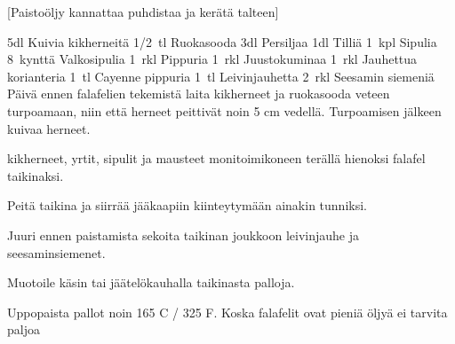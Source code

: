 [Paistoöljy kannattaa puhdistaa ja kerätä talteen]

\begin{step}
  5dl Kuivia kikherneitä
  1/2~tl Ruokasooda
  3dl Persiljaa
  1dl Tilliä
  1~kpl Sipulia
  8~kynttä Valkosipulia
  1~rkl Pippuria
  1~rkl Juustokuminaa
  1~rkl Jauhettua korianteria
  1~tl Cayenne pippuria
  1~tl Leivinjauhetta
  2~rkl Seesamin siemeniä
  \method
  Päivä ennen falafelien tekemistä laita kikherneet ja ruokasooda veteen turpoamaan, niin että herneet peittivät noin 5 cm vedellä. Turpoamisen jälkeen kuivaa herneet.

  kikherneet, yrtit, sipulit ja mausteet monitoimikoneen terällä hienoksi falafel taikinaksi.

  Peitä taikina ja siirrää jääkaapiin kiinteytymään ainakin tunniksi.

  Juuri ennen paistamista sekoita taikinan joukkoon leivinjauhe ja seesaminsiemenet.

  Muotoile käsin tai jäätelökauhalla taikinasta palloja.

  Uppopaista pallot noin 165 C / 325 F. Koska falafelit ovat pieniä öljyä ei tarvita paljoa
\end{step}
